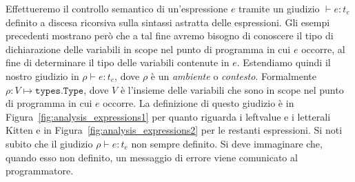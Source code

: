 Effettueremo il controllo semantico di un'espressione $e$ tramite un giudizio
$\vdash e:t_e$ definito a discesa ricorsiva sulla sintassi astratta delle
espressioni. Gli esempi precedenti mostrano per\`o che a tal fine avremo
bisogno di conoscere il tipo di dichiarazione
delle variabili in scope nel punto di programma in cui $e$ occorre,
al fine di determinare il tipo delle variabili contenute in $e$.
Estendiamo quindi il nostro giudizio in $\rho\vdash e:t_e$,
dove $\rho$ \`e un \emph{ambiente} o \emph{contesto}.
Formalmente $\rho:V\mapsto\mathtt{types.Type}$, dove
$V$ \`e l'insieme delle variabili che sono in scope nel punto di programma
in cui $e$ occorre. La definizione di questo giudizio \`e in
Figura~\ref{fig:analysis_expressions1} per quanto riguarda i leftvalue e i
letterali Kitten e in Figura~\ref{fig:analysis_expressions2} per le restanti
espressioni.
Si noti subito che il giudizio $\rho\vdash e:t_e$ non \e sempre definito.
Si deve immaginare che, quando esso non \e definito, un messaggio di errore
viene comunicato al programmatore.

